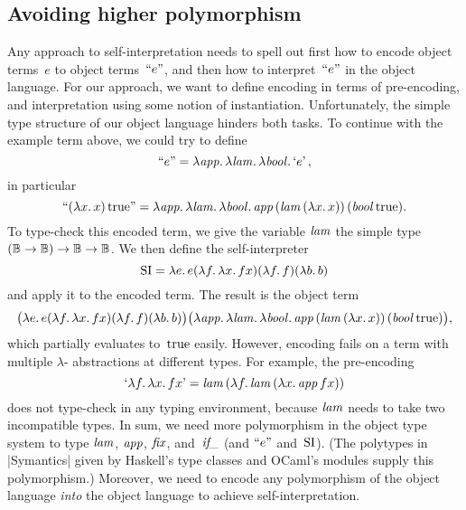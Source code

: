 \subsection{Avoiding higher polymorphism}

Any approach to self\hyp interpretation needs to spell out first how to
encode object terms~$e$ to object terms~$\Encode{e}$, and then how to
interpret~$\Encode{e}$ in the object language.  For our approach, we
want to define encoding in terms of pre-encoding, and interpretation
using some notion of instantiation.  Unfortunately, the simple type
structure of our object language hinders both tasks.  To continue with
the example term above, we could try to define
\begin{equation*}
    \Encode{e} =
    \fun{\ident{app}} \fun{\ident{lam}} \fun{\ident{bool}} \encode{e},
\end{equation*}
in particular
\begin{equation*}
    \Encode{(\fun{x}x)\True} =
    \fun{\ident{app}} \fun{\ident{lam}} \fun{\ident{bool}}
    \ident{app} (\ident{lam} (\fun{x} x))\, (\ident{bool} \True).
\end{equation*}
To type-check this encoded term, we give the variable $\ident{lam}$ the
simple type $(\BB\to\BB)\to\BB\to\BB$.
We then define the self\hyp interpreter
\begin{equation*}
    \si = \fun{e} e
    (\fun{f} \fun{x} fx)
    (\fun{f} f)
    (\fun{b} b)
\end{equation*}
and apply it to the encoded term.  The result is the object term
\begin{equation*}
    \bigl(\fun{e} e (\fun{f} \fun{x} fx) (\fun{f} f) (\fun{b} b)\bigr)
    \bigl(
    \fun{\ident{app}} \fun{\ident{lam}} \fun{\ident{bool}}
    \ident{app} (\ident{lam} (\fun{x} x))\, (\ident{bool} \True)
    \bigr),
\end{equation*}
which partially evaluates to~$\True$ easily.
However, encoding fails on a term with multiple $\lambda$\hyp
abstractions at different types.  For example, the pre-encoding
\begin{equation*}
    \encode{\fun{f}\fun{x}fx}
    = \ident{lam} (\fun{f} \ident{lam} (\fun{x} \ident{app} f x))
\end{equation*}
does not type-check in any typing environment, because $\ident{lam}$ needs
to take two incompatible types.  In sum, we need more polymorphism in the
object type system to type $\ident{lam}$, $\ident{app}$, $\ident{fix}$,
and~$\ident{if\_}$ (and $\Encode{e}$ and~$\si$).
(The polytypes in |Symantics| given by Haskell's type classes and OCaml's
modules supply this polymorphism.)  Moreover, we need to encode any
polymorphism of the object language \emph{into} the object language to achieve
self\hyp interpretation.

